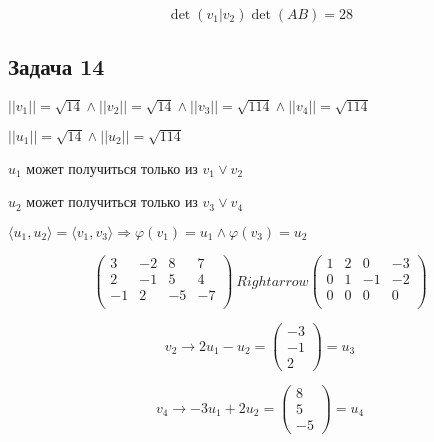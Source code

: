 \documentclass[a4paper,12pt]{article}
\begin{document}
\[
\det(v_1|v_2) \det(AB) = 28
\]

\subsection{Задача 14}
$||v_1|| = \sqrt{14} \land ||v_2|| = \sqrt{14} \land ||v_3|| = \sqrt{114} \land ||v_4|| = \sqrt{114}$

$||u_1|| = \sqrt{14} \land ||u_2|| = \sqrt{114}$

$u_1$ может получиться только из $v_1 \lor v_2$

$u_2$ может получиться только из $v_3 \lor v_4$

$\langle u_1, u_2 \rangle = \langle v_1, v_3 \rangle \Rightarrow \varphi (v_1) = u_1 \land \varphi(v_3) = u_2$

\[
\begin{pmatrix}
    3 & -2 & 8 & 7 \\
    2 & -1 & 5 & 4 \\
    -1 & 2 & -5 & -7 \\
\end{pmatrix} \ Rightarrow \begin{pmatrix}
    1 & 2 & 0 & -3 \\
    0 & 1 & -1 & -2 \\
    0 & 0 & 0 & 0 \\
\end{pmatrix}
\]

\[
v_2 \to 2u_1 - u_2 = \begin{pmatrix}
    -3 \\ -1 \\ 2 
\end{pmatrix}  = u_3
\]

\[
v_4 \to -3 u_1 + 2 u_2 = \begin{pmatrix}
    8 \\ 5 \\ -5
\end{pmatrix} = u_4
\]
\end{document}
